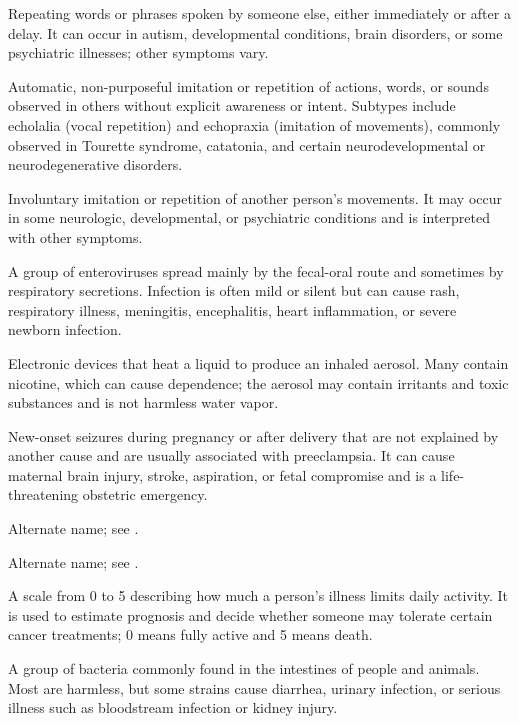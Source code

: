  Repeating words or phrases spoken by someone else, either immediately or after a delay. It can occur in autism, developmental conditions, brain disorders, or some psychiatric illnesses; other symptoms vary.

 Automatic, non-purposeful imitation or repetition of actions, words, or sounds observed in others without explicit awareness or intent. Subtypes include echolalia (vocal repetition) and echopraxia (imitation of movements), commonly observed in Tourette syndrome, catatonia, and certain neurodevelopmental or neurodegenerative disorders.

 Involuntary imitation or repetition of another person’s movements. It may occur in some neurologic, developmental, or psychiatric conditions and is interpreted with other symptoms.

 A group of enteroviruses spread mainly by the fecal-oral route and sometimes by respiratory secretions. Infection is often mild or silent but can cause rash, respiratory illness, meningitis, encephalitis, heart inflammation, or severe newborn infection.

 Electronic devices that heat a liquid to produce an inhaled aerosol. Many contain nicotine, which can cause dependence; the aerosol may contain irritants and toxic substances and is not harmless water vapor.

 New-onset seizures during pregnancy or after delivery that are not explained by another cause and are usually associated with preeclampsia. It can cause maternal brain injury, stroke, aspiration, or fetal compromise and is a life-threatening obstetric emergency.

 Alternate name; see .

 Alternate name; see .

 A scale from 0 to 5 describing how much a person’s illness limits daily activity. It is used to estimate prognosis and decide whether someone may tolerate certain cancer treatments; 0 means fully active and 5 means death.

 A group of bacteria commonly found in the intestines of people and animals. Most are harmless, but some strains cause diarrhea, urinary infection, or serious illness such as bloodstream infection or kidney injury.

